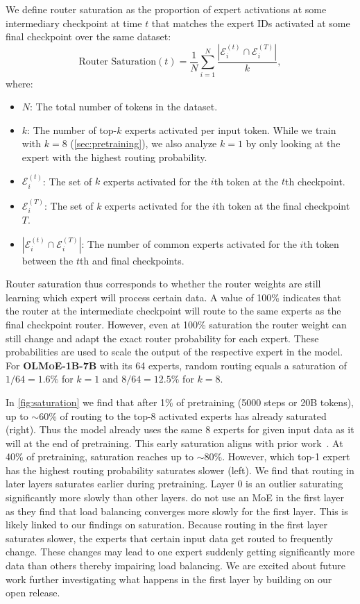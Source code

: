 \documentclass{article}
\newcommand{\modelsmall}{\textbf{\textsc{OLMoE-1B-7B}}}
\begin{document}
We define router saturation as the proportion of expert activations at some intermediary checkpoint at time $t$ that matches the expert IDs activated at some final checkpoint over the same dataset:
\begin{equation}\label{eq:routersaturation}
\text{Router Saturation}(t) = \frac{1}{N} \sum_{i=1}^{N} \frac{|\mathcal{E}_{i}^{(t)} \cap \mathcal{E}_{i}^{(T)}|}{k},
\end{equation}
where:
\begin{itemize}
\item $N$: The total number of tokens in the dataset.
\item $k$: The number of top-$k$ experts activated per input token. While we train with $k=8$ (\autoref{sec:pretraining}), we also analyze $k=1$ by only looking at the expert with the highest routing probability.
\item $\mathcal{E}_{i}^{(t)}$: The set of $k$ experts activated for the $i$th token at the $t$th checkpoint.
\item $\mathcal{E}_{i}^{(T)}$: The set of $k$ experts activated for the $i$th token at the final checkpoint $T$.
\item $|\mathcal{E}_{i}^{(t)} \cap \mathcal{E}_{i}^{(T)}|$: The number of common experts activated for the $i$th token between the $t$th and final checkpoints.
\end{itemize}
Router saturation thus corresponds to whether the router weights are still learning which expert will process certain data. A value of 100\% indicates that the router at the intermediate checkpoint will route to the same experts as the final checkpoint router. However, even at 100\% saturation the router weight can still change and adapt the exact router probability for each expert. These probabilities are used to scale the output of the respective expert in the model. For \modelsmall{} with its 64 experts, random routing equals a saturation of $1/64=1.6\%$ for $k=1$ and $8/64=12.5\%$ for $k=8$. 

In \autoref{fig:saturation} we find that after 1\% of pretraining (5000 steps or 20B tokens), up to $\sim$60\% of routing to the top-8 activated experts has already saturated (right). Thus the model already uses the same 8 experts for given input data as it will at the end of pretraining. This early saturation aligns with prior work~\citep{xue2024openmoe}. At 40\% of pretraining, saturation reaches up to $\sim$80\%. However, which top-1 expert has the highest routing probability saturates slower (left). We find that routing in later layers saturates earlier during pretraining. Layer 0 is an outlier saturating significantly more slowly than other layers. \citet{dai2024deepseekmoeultimateexpertspecialization} do not use an MoE in the first layer as they find that load balancing converges more slowly for the first layer. This is likely linked to our findings on saturation. Because routing in the first layer saturates slower, the experts that certain input data get routed to frequently change. These changes may lead to one expert suddenly getting significantly more data than others thereby impairing load balancing. We are excited about future work further investigating what happens in the first layer by building on our open release.
\end{document}
